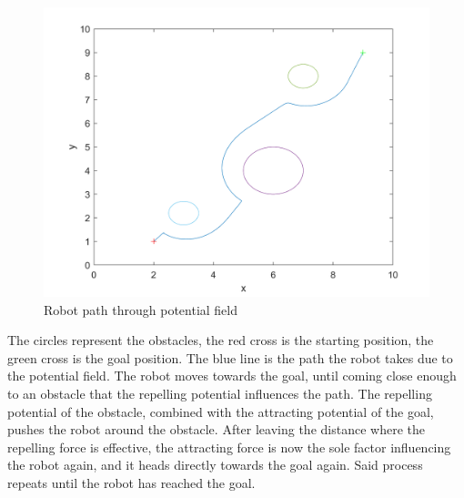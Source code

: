 \documentclass[11pt]{article}
\begin{document}
    \begin{figure}[H]
        \centering
        \includegraphics[width=1.0\textwidth]{../test/images/robot_path}
        \caption{Robot path through potential field}
        \label{fig:robpath}
    \end{figure}
    The circles represent the obstacles, the red cross is the starting position, the green cross is the goal position.
    The blue line is the path the robot takes due to the potential field.\newline
    The robot moves towards the goal, until coming close enough to an obstacle that the repelling potential influences the path.
    The repelling potential of the obstacle, combined with the attracting potential of the goal, pushes the robot around the obstacle.
    After leaving the distance where the repelling force is effective, the attracting force is now the sole factor influencing the robot again, and it heads directly towards the goal again.
    Said process repeats until the robot has reached the goal.

    \clearpage
    \printbibliography

    \clearpage
    \listoffigures
\end{document}
